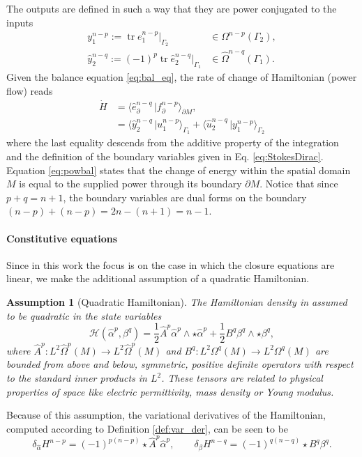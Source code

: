 \documentclass{elsarticle}
\newcommand{\revTwo}[1]{{\color{black}#1}}
\newtheorem{assumption}{Assumption}
\DeclareMathOperator{\tr}{tr}
\newcommand*{\dual}[1]{\ensuremath{\widehat{#1}}}
\newcommand{\dualpr}[3][]{\ensuremath{\langle #2 \, \vert #3 \rangle_{#1}}}
\begin{document}
\revTwo{
The outputs are defined in such a way that they are power conjugated to the inputs
 \begin{equation}\label{eq:y}
 \begin{aligned}
      y^{n-p}_1 := \tr e^{n-p}_1 \vert_{\Gamma_2} &\in \Omega^{n-p}(\Gamma_2), \\
    \dual{y}^{n-q}_2 := (-1)^p \tr \dual{e}^{n-q}_2 \vert_{\Gamma_1} &\in \dual{\Omega}^{n-q}(\Gamma_1). 
 \end{aligned}
 \end{equation}
Given the balance equation \eqref{eq:bal_eq}, the rate of change of Hamiltonian (power flow) reads
\begin{equation}\label{eq:powbal}
\begin{aligned}
    \dot{H} &= \dualpr[\partial M]{\dual{e}_\partial^{n-q}}{f_\partial^{n-p}}, \\
    &= \dualpr[\Gamma_1]{\dual{y}^{n-q}_2}{u^{n-p}_1} + \dualpr[\Gamma_2]{\dual{u}^{n-q}_2}{y^{n-p}_1}
\end{aligned}
\end{equation}
where the last equality descends from the additive property of the integration and the definition of the boundary variables given in Eq. \eqref{eq:StokesDirac}.
Equation \eqref{eq:powbal} states that the change of energy within the spatial domain $M$ is equal to the supplied power through its boundary $\partial M$. Notice that since $p+q=n+1$, the boundary variables are dual forms on the boundary $(n-p) + (n-p) = 2n - (n+1) = n-1$.
}



\paragraph{Constitutive equations}
Since in this work the focus is on the case in which the closure equations are linear, we make the additional assumption of a quadratic Hamiltonian.
\begin{assumption}[Quadratic Hamiltonian]\label{ass:quad_Ham}
The Hamiltonian density in assumed to be quadratic in the state variables
\begin{equation}\label{eq:H_den}
\mathcal{H}(\dual{\alpha}^p, \beta^{q}) = 
    \frac{1}{2} \dual{A}^p \dual{\alpha}^p \wedge {\star \dual{\alpha}^p} + \frac{1}{2}  B^q \beta^{q} \wedge {\star  \beta^{q}},
\end{equation}
where $\dual{A}^p: L^2\dual{\Omega}^{p}(M) \rightarrow L^2\dual{\Omega}^{p}(M)$ and $B^q: L^2\Omega^{q}(M) \rightarrow L^2\Omega^{q}(M)$ are bounded from above and below, symmetric, positive definite operators with respect to the standard inner products in $L^2$. These tensors are related to physical properties of space like electric permittivity, mass density or Young modulus.
\end{assumption}
Because of this assumption, the variational derivatives of the Hamiltonian, computed according to Definition \ref{def:var_der}, can be seen to be
\begin{equation}
    \delta_{\dual{\alpha}} H^{n-p} = (-1)^{p(n-p)}\star \dual{A}^p\dual{\alpha}^p, \qquad
    \delta_{\beta} H^{n-q} = (-1)^{q(n-q)}\star B^q\beta^{q}.
\end{equation} 
\end{document}
